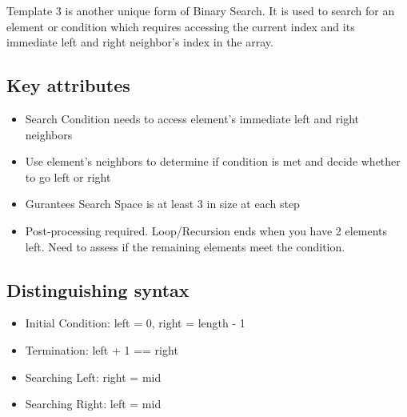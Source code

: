 Template 3 is another unique form of Binary Search.
It is used to search for an element or condition which requires accessing the current index and its immediate left and right neighbor's index in the array.




\subsection{Key attributes}

\begin{itemize}
\item Search Condition needs to access element's immediate left and right neighbors
\item Use element's neighbors to determine if condition is met and decide whether to go left or right
\item Gurantees Search Space is at least 3 in size at each step
\item Post-processing required. Loop/Recursion ends when you have 2 elements left. Need to assess if the remaining elements meet the condition.
\end{itemize}


\subsection{Distinguishing syntax}

\begin{itemize}
\item Initial Condition: left = 0, right = length - 1
\item Termination: left + 1 == right
\item Searching Left: right = mid
\item Searching Right: left = mid
\end{itemize}


